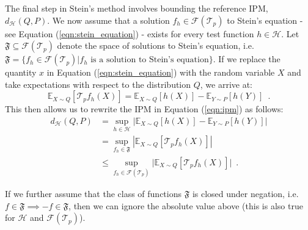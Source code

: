 The final step in Stein's method involves bounding the reference IPM, $d_{\mathcal{H}}(Q, P)$. We now assume that a solution $f_h \in \mathcal{F}(\mathcal{T}_p)$ to Stein's equation - see Equation (\ref{eqn:stein_equation}) - exists for every test function $h \in \mathcal{H}$. Let $\mathfrak{F} \subseteq \mathcal{F}(\mathcal{T}_p)$ denote the space of solutions to Stein's equation, i.e. $\mathfrak{F} = \{f_h \in \mathcal{F}(\mathcal{T}_p)| f_h \text{ is a solution to Stein's equation}\}$. If we replace the quantity $x$ in Equation (\ref{eqn:stein_equation}) with the random variable $X$ and take expectations with respect to the distribution $Q$, we arrive at:
\begin{equation*}
\mathbb{E}_{X \sim Q}\left[\mathcal{T}_p f_h(X) \right] = \mathbb{E}_{X \sim Q}\left[h(X) \right] - \mathbb{E}_{Y \sim P}\left[h(Y) \right] \enspace .
\end{equation*}
This then allows us to rewrite the IPM in Equation (\ref{eqn:ipm}) as follows:
\begin{align*}
d_{\mathcal{H}}(Q, P) &= \underset{h \in \mathcal{H}}{\sup}\big|\mathbb{E}_{X \sim Q}\left[h(X)\right] - \mathbb{E}_{Y \sim P}\left[h(Y)\right] \big|\\
&= \underset{f_h \in \mathfrak{F}}{\sup} \left|\mathbb{E}_{X \sim Q} \left[\mathcal{T}_p f_h(X) \right] \right|\\
& \leq \underset{f_h \in \mathcal{F}(\mathcal{T}_p)}{\sup}\big|\mathbb{E}_{X \sim Q}\left[\mathcal{T}_p f_h(X) \right] \big| \enspace. \tag{2.5}\label{eqn:stein_bound}
\end{align*}

If we further assume that the class of functions $\mathfrak{F}$ is closed under negation, i.e. $f \in \mathfrak{F} \implies -f \in \mathfrak{F}$, then we can ignore the absolute value above (this is also true for $\mathcal{H}$ and $\mathcal{F}(\mathcal{T}_p)$).

